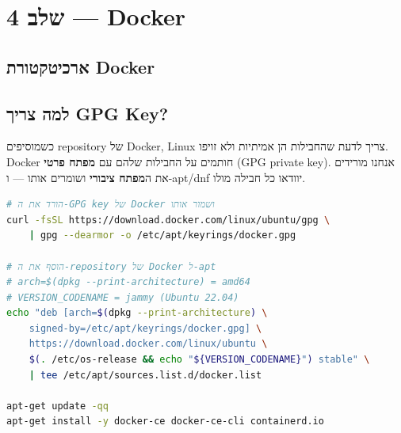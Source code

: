\documentclass[12pt,a4paper]{article}
\begin{document}
\newpage
\section{שלב 4 — Docker}

\subsection{ארכיטקטורת Docker}

\begin{center}
\end{center}

\subsection{למה צריך GPG Key?}

כשמוסיפים repository של Docker, Linux צריך לדעת שהחבילות הן אמיתיות ולא זויפו. Docker חותמים על החבילות שלהם עם \textbf{מפתח פרטי} (GPG private key). אנחנו מורידים את ה\textbf{מפתח ציבורי} ושומרים אותו — ו-apt/dnf יוודאו כל חבילה מולו.

\begin{lstlisting}[language=bash, caption={setup\_docker.sh — הוספת GPG key ו-repository}]
# הורד את ה-GPG key של Docker ושמור אותו
curl -fsSL https://download.docker.com/linux/ubuntu/gpg \
    | gpg --dearmor -o /etc/apt/keyrings/docker.gpg

# הוסף את ה-repository של Docker ל-apt
# arch=$(dpkg --print-architecture) = amd64
# VERSION_CODENAME = jammy (Ubuntu 22.04)
echo "deb [arch=$(dpkg --print-architecture) \
    signed-by=/etc/apt/keyrings/docker.gpg] \
    https://download.docker.com/linux/ubuntu \
    $(. /etc/os-release && echo "${VERSION_CODENAME}") stable" \
    | tee /etc/apt/sources.list.d/docker.list

apt-get update -qq
apt-get install -y docker-ce docker-ce-cli containerd.io
\end{lstlisting}
\end{document}
